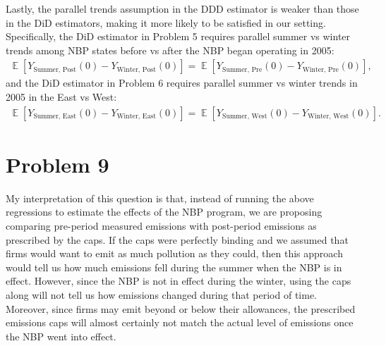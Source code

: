 \documentclass[12pt]{article}
\DeclareMathOperator{\EX}{\mathbb{E}}%
\begin{document}
Lastly, the parallel trends assumption in the DDD estimator is weaker than those in the DiD estimators, making it more likely to be satisfied in our setting. Specifically, the DiD estimator in Problem 5 requires parallel summer vs winter trends among NBP states before vs after the NBP began operating in 2005:
\begin{align*}
	\EX[Y_{\text{Summer, Post}}(0) - Y_{\text{Winter, Post}}(0)] = \EX[Y_{\text{Summer, Pre}}(0) - Y_{\text{Winter, Pre}}(0)],
\end{align*}
and the DiD estimator in Problem 6 requires parallel summer vs winter trends in 2005 in the East vs West:
\begin{align*}
	\EX[Y_{\text{Summer, East}}(0) - Y_{\text{Winter, East}}(0)] = \EX[Y_{\text{Summer, West}}(0) - Y_{\text{Winter, West}}(0)].
\end{align*}


\section*{Problem 9}
My interpretation of this question is that, instead of running the above regressions to estimate the effects of the NBP program, we are proposing comparing pre-period measured emissions with post-period emissions as prescribed by the caps. If the caps were perfectly binding and we assumed that firms would want to emit as much pollution as they could, then this approach would tell us how much emissions fell during the summer when the NBP is in effect. However, since the NBP is not in effect during the winter, using the caps along will not tell us how emissions changed during that period of time. Moreover, since firms may emit beyond or below their allowances, the prescribed emissions caps will almost certainly not match the actual level of emissions once the NBP went into effect.
\end{document}
